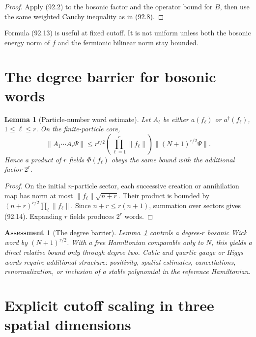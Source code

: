 \documentclass[11pt]{article}
\newtheorem{lemma}[theorem]{Lemma}
\newtheorem{assessment}[theorem]{Assessment}
\theoremstyle{remark}
\begin{document}
\begin{proof}
Apply (92.2) to the bosonic factor and the operator bound for \(B\),
then use the same weighted Cauchy inequality as in (92.8).
\end{proof}

Formula (92.13) is useful at fixed cutoff.  It is not uniform unless
both the bosonic energy norm of \(f\) and the fermionic bilinear norm
stay bounded.

\section{The degree barrier for bosonic words}

\begin{lemma}[Particle-number word estimate]
\label{lem:v15v92-words}
Let \(A_\ell\) be either \(a(f_\ell)\) or
\(a^\dagger(f_\ell)\), \(1\leq\ell\leq r\).  On the finite-particle
core,
\[
 \|A_1\cdots A_r\Psi\|
 \leq r^{r/2}\left(\prod_{\ell=1}^r\|f_\ell\|\right)
       \|(N+1)^{r/2}\Psi\|.                           \tag{92.14}
\]
Hence a product of \(r\) fields \(\Phi(f_\ell)\) obeys the same
bound with the additional factor \(2^r\).
\end{lemma}

\begin{proof}
On the initial \(n\)-particle sector, each successive creation or
annihilation map has norm at most
\(\|f_\ell\|\sqrt{n+r}\).  Their product is bounded by
\((n+r)^{r/2}\prod_\ell\|f_\ell\|\).  Since
\(n+r\leq r(n+1)\), summation over sectors gives (92.14).
Expanding \(r\) fields produces \(2^r\) words.
\end{proof}

\begin{assessment}[The degree barrier]
\label{ass:v15v92-degree}
Lemma~\ref{lem:v15v92-words} controls a degree-\(r\) bosonic Wick
word by \((N+1)^{r/2}\).  With a free Hamiltonian comparable only
to \(N\), this yields a direct relative bound only through degree
two.  Cubic and quartic gauge or Higgs words require additional
structure: positivity, spatial estimates, cancellations,
renormalization, or inclusion of a stable polynomial in the
reference Hamiltonian.
\end{assessment}

\section{Explicit cutoff scaling in three spatial dimensions}
\end{document}
